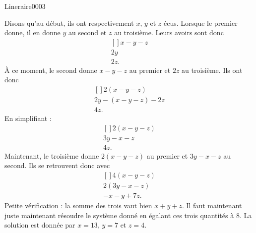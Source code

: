 \begin{corrige}{Lineraire0003}

	Disons qu'au début, ils ont respectivement $x$, $y$ et $z$ écus. Lorsque le premier donne, il en donne $y$ au second et $z$ au troisième. Leurs avoirs sont donc
	\begin{equation}
		\begin{aligned}[]
			x-y-z\\
			2y\\
			2z.
		\end{aligned}
	\end{equation}
	À ce moment, le second donne $x-y-z$ au premier et $2z$ au troisième. Ils ont donc
	\begin{equation}
		\begin{aligned}[]
			2(x-y-z)\\
			2y-(x-y-z)-2z\\
			4z.
		\end{aligned}
	\end{equation}
	En simplifiant :
	\begin{equation}
		\begin{aligned}[]
			2(x-y-z)\\
			3y-x-z\\
			4z.
		\end{aligned}
	\end{equation}
	Maintenant, le troisième donne $2(x-y-z)$ au premier et $3y-x-z$ au second. Ils se retrouvent donc avec
	\begin{equation}
		\begin{aligned}[]
			4(x-y-z)\\
			2(3y-x-z)\\
			-x-y+7z.
		\end{aligned}
	\end{equation}
	Petite vérification : la somme des trois vaut bien $x+y+z$. Il faut maintenant juste maintenant résoudre le système donné en égalant ces trois quantités à $8$. La solution est donnée par $x=13$, $y=7$ et $z=4$.
\end{corrige}
